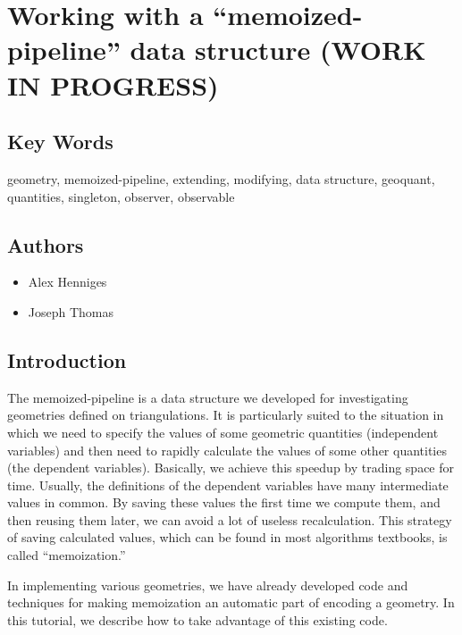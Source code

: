 \documentclass[10pt]{article}%
\begin{document}

\section*{Working with a ``memoized-pipeline'' data structure (WORK IN PROGRESS)}

\label{f0}
\subsection*{Key Words}

geometry, memoized-pipeline, extending, modifying, data structure, geoquant, quantities, singleton, observer, observable

\subsection*{Authors}

\begin{itemize}\item  Alex Henniges
\item  Joseph Thomas
\end{itemize}

\subsection*{Introduction}

The memoized-pipeline is a data structure we developed for investigating geometries defined on triangulations. It is particularly suited to the situation in which we need to specify the values of some geometric quantities (independent variables) and then need to rapidly calculate the values of some other quantities (the dependent variables). Basically, we achieve this speedup by trading space for time. Usually, the definitions of the dependent variables have many intermediate values in common. By saving these values the first time we compute them, and then reusing them later, we can avoid a lot of useless recalculation. This strategy of saving calculated values, which can be found in most algorithms textbooks, is called ``memoization.'' 

In implementing various geometries, we have already developed code and techniques for making memoization an automatic part of encoding a geometry. In this tutorial, we describe how to take advantage of this existing code.
\end{document}
